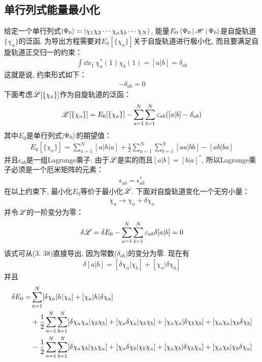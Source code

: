 \subsection{单行列式能量最小化}
给定一个单行列式$\Ket{\Psi_0} = \Ket{\chi_1\chi_2\cdots\chi_a\chi_b\cdots\chi_N}$, 
能量$E_0\Braket{\Psi_0|\mathscr{H}|\Psi_0}$是自旋轨道$\{\chi_a\}$的泛函. 
为导出\hft 方程需要对$E_0[\{\chi_a \}]$关于自旋轨道进行极小化, 
而且要满足自旋轨道正交归一的约束：
\begin{align}
	\int\dd{x}_1\,\chi_a^*(1)\chi_b(1) = [a|b] = \delta_{ab}
\end{align}
这就是说, 
约束形式如下：
\begin{align}
	[a|b] - \delta_{ab} = 0
\end{align}
下面考虑$\mathscr{L}[\{\chi_a \}]$作为自旋轨道的泛函：
\begin{align}
	\mathscr{L}[\{\chi_a \}] = E_0[\{\chi_a\}] - \sum_{a=1}^{N}\sum_{b=1}^{N}\varepsilon_{ab}([a|b]-\delta_{ab})
\end{align}
其中$E_0$是单行列式$\Ket{\Psi_0}$的期望值：
\begin{align}
	E_0[\{\chi_a\}] = \sum_{a=1}^{N}[a|h|a] + \frac{1}{2}\sum_{a=1}^{N}\sum_{b=1}^{N}[aa|bb]- [ab|ba]
\end{align}
并且$\epsilon_{ab}$是一组Lagrange乘子. 
由于$\mathscr{L}$是实的而且$[a|b]=[b|a]^*$, 
所以Lagrange乘子必须是一个厄米矩阵的元素：
\begin{align}
	\label{3.40}
	\epsilon_{ab} = \epsilon_{ab}^*
\end{align}
在以上约束下, 
最小化$E_0$等价于最小化$\mathscr{L}$. 
下面对自旋轨道变化一个无穷小量：
\begin{align}
	\chi_a \to \chi_a+\delta\chi_a
\end{align}
并令$\mathscr{L}$的一阶变分为零：
\begin{align}
	\delta\mathscr{L} = \delta E_0 - \sum_{a=1}^{N}\sum_{b=1}^{N}\varepsilon_{ab}\delta[a|b] = 0
\end{align}
该式可从(3.
38)直接导出, 
因为常数($\delta_{ab}$)的变分为零. 
现在有
\begin{align}
	\delta[a|b] = [\delta\chi_a|\chi_b] + [\chi_a|\delta\chi_b]
\end{align}
并且
\begin{align}
	\delta E_0 = & \sum_{a=1}^{N}[\delta\chi_a|h|\chi_a] + [\chi_a|h|\delta\chi_a]\notag\\
	& + \frac{1}{2}\sum_{a=1}^{N}\sum_{b=1}^{N}[\delta\chi_a\chi_a|\chi_b\chi_b] + [\chi_a\delta\chi_a|\chi_b\chi_b] + [\chi_a\chi_a|\delta\chi_b\chi_b] + [\chi_a\chi_a|\chi_b\delta\chi_b]\notag\\
	& - \frac{1}{2}\sum_{a=1}^{N}\sum_{b=1}^{N}[\delta\chi_a\chi_b|\chi_b\chi_a] + [\chi_a\delta\chi_b|\chi_b\chi_a] + [\chi_a\chi_b|\delta\chi_b\chi_a] + [\chi_a\chi_b|\chi_b\delta\chi_a]
\end{align}
